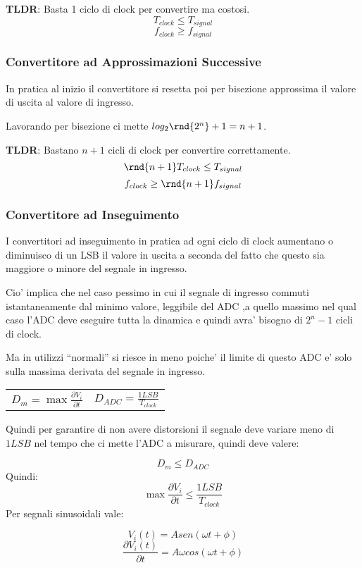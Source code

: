 \documentclass[\main/main.tex]{subfiles}
\begin{document}
\textbf{TLDR}: Basta 1 ciclo di clock per convertire ma costosi.
\[T_{clock} \le T_{signal}\]
\[f_{clock} \ge  f_{signal}\]

\subsubsection{Convertitore ad Approssimazioni Successive}
In pratica al inizio il convertitore si resetta poi per bisezione approssima il valore di uscita al valore di ingresso.

Lavorando per bisezione ci mette $log_2\rnd{2^n} + 1 = n + 1$.

\textbf{TLDR}: Bastano $n+1$ cicli di clock per convertire correttamente.
\[\rnd{n + 1} T_{clock} \le T_{signal}\]
\[f_{clock} \ge \rnd{n + 1} f_{signal}\]


\subsubsection{Convertitore ad Inseguimento}

I convertitori ad inseguimento in pratica ad ogni ciclo di clock aumentano o diminuisco di un LSB il valore in uscita a seconda del fatto che questo sia maggiore o minore del segnale in ingresso.

Cio' implica che nel caso pessimo in cui il segnale di ingresso commuti istantaneamente dal minimo valore, leggibile del ADC ,a quello massimo nel qual caso l'ADC deve eseguire tutta la dinamica e quindi avra' bisogno di $2^n - 1$ cicli di clock.

Ma in utilizzi ``normali'' si riesce in meno poiche' il limite di questo ADC e' solo sulla massima derivata del segnale in ingresso.
\begin{center}
    \begin{tabular}{ c c }
        $D_m = \max{\frac{\partial V_i}{\partial t}}$ &
        $D_{ADC} = \frac{1LSB}{T_{clock}}$
    \end{tabular}
\end{center}

Quindi per garantire di non avere distorsioni il segnale deve variare meno di $1 LSB$ nel tempo che ci mette l'ADC a misurare, quindi deve valere:

\[D_m \le D_{ADC}\]
Quindi:
\[ \max{\frac{\partial V_i}{\partial t}} \le \frac{1LSB}{T_{clock}}\]
Per segnali sinusoidali vale:

\[V_i(t) = A sen(\omega t + \phi)\]
\[\frac{\partial V_i(t)}{\partial t} = A \omega cos(\omega t + \phi)\]
\end{document}
